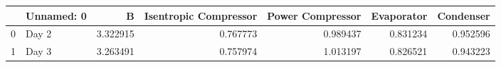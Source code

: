 \begin{tabular}{llrrrrr}
\toprule
{} & Unnamed: 0 &         B &  Isentropic Compressor &  Power Compressor &  Evaporator &  Condenser \\
\midrule
0 &      Day 2 &  3.322915 &               0.767773 &          0.989437 &    0.831234 &   0.952596 \\
1 &      Day 3 &  3.263491 &               0.757974 &          1.013197 &    0.826521 &   0.943223 \\
\bottomrule
\end{tabular}
